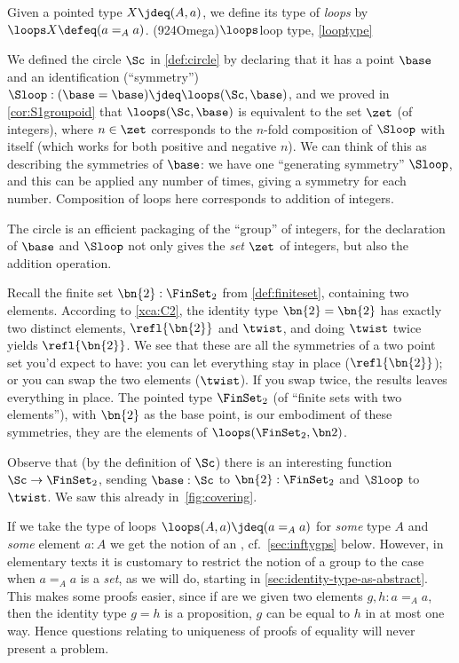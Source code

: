 \begin{definition}\label{looptype}
  Given a pointed type $X\jdeq(A,a)$, we define its type of \emph{loops}
  by $\loops X \defeq (a =_A a)$.%
  \glossary(924Omega){$\protect\loops$}{loop type, \cref{looptype}}
\end{definition}
\begin{example}\label{ex:base=base}
  We defined the circle $\Sc$ in \cref{def:circle} by declaring
  that it has a point $\base$ and an identification (``symmetry'')
  $\Sloop:(\base=\base) \jdeq \loops(\Sc,\base)$,
  and we proved in \cref{cor:S1groupoid} that $\loops(\Sc,\base)$ is equivalent
  to the set $\zet$ (of integers),
  where $n\in\zet$ corresponds to the $n$-fold composition of $\Sloop$ with itself
  (which works for both positive and negative $n$).
  We can think of this as describing the symmetries of $\base$:
  we have one ``generating symmetry'' $\Sloop$,
  and this can be applied any number of times,
  giving a symmetry for each number.
  Composition of loops here corresponds to addition of integers.

  The circle is an efficient packaging of the ``{group}'' of integers, for the declaration of $\base$ and $\Sloop$ not only gives the \emph{set}
  $\zet$ of integers, but also the addition operation.
\end{example}
\begin{example}
  Recall the finite set $\bn{2}:\FinSet_2$ from \cref{def:finiteset}, containing two elements.
  According to \cref{xca:C2}, the identity type $\bn{2} =\bn{2} $ has exactly two distinct elements,
  $\refl{\bn{2}}$ and $\twist$,
  and doing $\twist$ twice yields $\refl{\bn{2}}$.
  We see that these are all the symmetries
  of a two point set you'd expect to have:
  you can let everything stay in place ($\refl{\bn{2}}$);
  or you can swap the two elements ($\twist$).
  If you swap twice, the results leaves everything in place.
  The pointed type $\FinSet_2$ (of ``finite sets with two elements''),
  with $\bn{2}$ as the base point,
  is our embodiment of these symmetries, \ie they are the elements of $\loops(\FinSet_2,\bn 2)$.

  Observe that (by the definition of $\Sc$)
  there is an interesting function $\Sc\to\FinSet_2$,
  sending $\base:\Sc$ to $\bn{2} :\FinSet_2$ and $\Sloop$ to $\twist$.
  We saw this already in~\cref{fig:covering}.
\end{example}

If we take the type of loops $\loops(A,a) \jdeq (a=_Aa)$
for \emph{some} type $A$ and \emph{some} element $a:A$
we get the notion of an \inftygp, cf.~\cref{sec:inftygps} below.
However, in elementary texts it is customary to restrict the notion of a group to the case when $a=_Aa$ is a \emph{set}, as we will do, starting in \cref{sec:identity-type-as-abstract}.
This makes some proofs easier, since if are we given two elements $g,h:a=_Aa$, then the identity type $g=h$ is a proposition, \ie $g$ can be equal to $h$ in at most one way.  Hence questions relating to uniqueness of proofs of equality will never present a problem.

